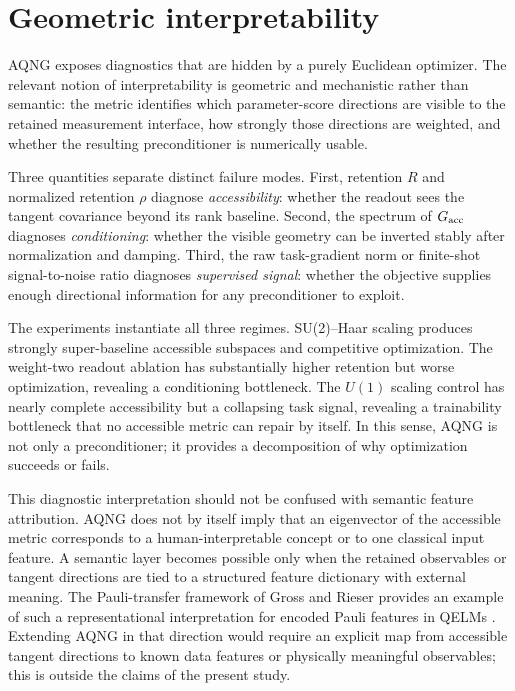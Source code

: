 \section{Geometric interpretability}

AQNG exposes diagnostics that are hidden by a purely Euclidean optimizer. The relevant notion of interpretability is geometric and mechanistic rather than semantic: the metric identifies which parameter-score directions are visible to the retained measurement interface, how strongly those directions are weighted, and whether the resulting preconditioner is numerically usable.

Three quantities separate distinct failure modes. First, retention $R$ and normalized retention $\rho$ diagnose \emph{accessibility}: whether the readout sees the tangent covariance beyond its rank baseline. Second, the spectrum of $G_{\mathrm{acc}}$ diagnoses \emph{conditioning}: whether the visible geometry can be inverted stably after normalization and damping. Third, the raw task-gradient norm or finite-shot signal-to-noise ratio diagnoses \emph{supervised signal}: whether the objective supplies enough directional information for any preconditioner to exploit.

The experiments instantiate all three regimes. SU(2)--Haar scaling produces strongly super-baseline accessible subspaces and competitive optimization. The weight-two readout ablation has substantially higher retention but worse optimization, revealing a conditioning bottleneck. The $U(1)$ scaling control has nearly complete accessibility but a collapsing task signal, revealing a trainability bottleneck that no accessible metric can repair by itself. In this sense, AQNG is not only a preconditioner; it provides a decomposition of why optimization succeeds or fails.

This diagnostic interpretation should not be confused with semantic feature attribution. AQNG does not by itself imply that an eigenvector of the accessible metric corresponds to a human-interpretable concept or to one classical input feature. A semantic layer becomes possible only when the retained observables or tangent directions are tied to a structured feature dictionary with external meaning. The Pauli-transfer framework of Gross and Rieser provides an example of such a representational interpretation for encoded Pauli features in QELMs \cite{GrossRieser2026}. Extending AQNG in that direction would require an explicit map from accessible tangent directions to known data features or physically meaningful observables; this is outside the claims of the present study.
